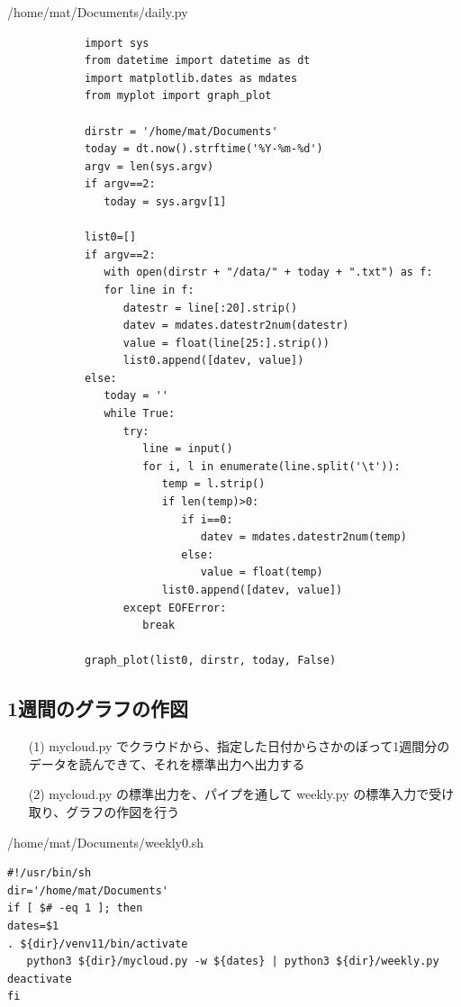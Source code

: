 \documentclass[12pt,a4paper,uplatex]{jsbook}
\begin{document}
\begin{spacing}{0.87}
	\begin{itembox}[l]{/home/mat/Documents/daily.py}
		\begin{verbatim}
			import sys
			from datetime import datetime as dt
			import matplotlib.dates as mdates
			from myplot import graph_plot
			
			dirstr = '/home/mat/Documents'
			today = dt.now().strftime('%Y-%m-%d')
			argv = len(sys.argv)
			if argv==2:
			   today = sys.argv[1]
			
			list0=[]
			if argv==2:
			   with open(dirstr + "/data/" + today + ".txt") as f:
			   for line in f:
			      datestr = line[:20].strip()
			      datev = mdates.datestr2num(datestr)
			      value = float(line[25:].strip())
			      list0.append([datev, value])
			else:
			   today = ''
			   while True:
			      try:
			         line = input()
			         for i, l in enumerate(line.split('\t')):
			            temp = l.strip()
			            if len(temp)>0:
			               if i==0:
			                  datev = mdates.datestr2num(temp)
			               else:
			                  value = float(temp)
			            list0.append([datev, value])
			      except EOFError:
			         break
			
			graph_plot(list0, dirstr, today, False)
  	 	\end{verbatim}
	\end{itembox}
\end{spacing}

\subsection{1週間のグラフの作図}

\begin{enumerate}
	\item[(1)] mycloud.py でクラウドから、指定した日付からさかのぼって1週間分のデータを読んできて、それを標準出力へ出力する
	\item[(2)] mycloud.py の標準出力を、パイプを通して weekly.py の標準入力で受け取り、グラフの作図を行う
\end{enumerate}

\begin{itembox}[l]{/home/mat/Documents/weekly0.sh}
	\begin{verbatim}
#!/usr/bin/sh
dir='/home/mat/Documents'
if [ $# -eq 1 ]; then
dates=$1
. ${dir}/venv11/bin/activate
   python3 ${dir}/mycloud.py -w ${dates} | python3 ${dir}/weekly.py
deactivate
fi
	\end{verbatim}
\end{itembox}
\end{document}
